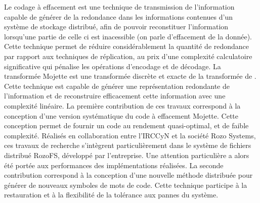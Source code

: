 
Le codage à effacement est une technique de transmission de l'information
capable de générer de la redondance dans les informations contenues d'un
système de stockage distribué, afin de pouvoir reconstituer l'information
lorsqu'une partie de celle ci est inacessible (on parle d'effacement de la
donnée). Cette technique permet de réduire considérablement la quantité de
redondance par rapport aux techniques de réplication, au prix d'une complexité
calculatoire significative qui pénalise les opérations d'encodage et de
décodage.
%
La transformée Mojette est une transformée discrète et exacte de la transformée
de \radon. Cette technique est capable de générer une représentation redondante
de l'information et de reconstruire efficacement cette information avec une
complexité linéaire.
%
La première contribution de ces travaux correspond à la conception d'une
version systématique du code à effacement Mojette. Cette conception permet de
fournir un code au rendement quasi-optimal, et de faible complexité.
%
Réalisés en collaboration entre l'IRCCyN et la société Rozo Systems, ces
travaux de recherche s'intègrent particulièrement dans le système de fichiers
distribué RozoFS, développé par l'entreprise. Une attention particulière a
alors été portée aux performances des implémentations réalisées.
%
La seconde contribution correspond à la conception d'une nouvelle méthode
distribuée pour générer de nouveaux symboles de mots de code. Cette technique
participe à la restauration et à la flexibilité de la tolérance aux pannes du
système.

